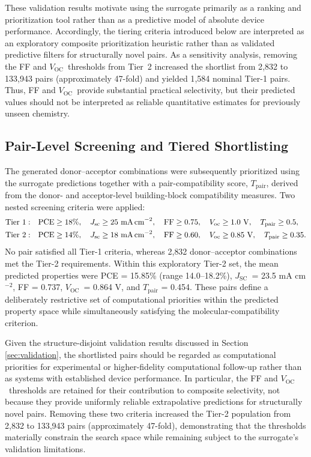 \documentclass[12pt]{article}
\newcommand{\voc}{$V_\mathrm{OC}$}
\newcommand{\jsc}{$J_\mathrm{SC}$}
\begin{document}
These validation results motivate using the surrogate primarily as a ranking and prioritization tool rather than as a predictive model of absolute device performance. Accordingly, the tiering criteria introduced below are interpreted as an exploratory composite prioritization heuristic rather than as validated predictive filters for structurally novel pairs. As a sensitivity analysis, removing the FF and \voc\ thresholds from Tier~2 increased the shortlist from 2{,}832 to 133{,}943 pairs (approximately 47-fold) and yielded 1{,}584 nominal Tier-1 pairs. Thus, FF and \voc\ provide substantial practical selectivity, but their predicted values should not be interpreted as reliable quantitative estimates for previously unseen chemistry.

\subsection{Pair-Level Screening and Tiered Shortlisting}
The generated donor--acceptor combinations were subsequently prioritized using the surrogate predictions together with a pair-compatibility score, $T_{\mathrm{pair}}$, derived from the donor- and acceptor-level building-block compatibility measures. Two nested screening criteria were applied:
\begin{equation}
\begin{aligned}
\mathrm{Tier\ 1}: \quad &
\mathrm{PCE} \geq 18\%, \quad
J_\mathrm{sc} \geq 25\ \text{mA\,cm}^{-2}, \quad
\mathrm{FF} \geq 0.75, \quad
V_\mathrm{oc} \geq 1.0\ \text{V}, \quad
T_{\mathrm{pair}} \geq 0.5,\\
\mathrm{Tier\ 2}: \quad &
\mathrm{PCE} \geq 14\%, \quad
J_\mathrm{sc} \geq 18\ \text{mA\,cm}^{-2}, \quad
\mathrm{FF} \geq 0.60, \quad
V_\mathrm{oc} \geq 0.85\ \text{V}, \quad
T_{\mathrm{pair}} \geq 0.35.
\end{aligned}
\end{equation}
No pair satisfied all Tier-1 criteria, whereas 2{,}832 donor--acceptor 
combinations met the Tier-2 requirements. Within this exploratory Tier-2 set, the mean predicted properties were PCE = 15.85\% (range 14.0--18.2\%), \jsc\ = 23.5 mA cm$^{-2}$, FF = 0.737, \voc\ = 0.864 V, and 
$T_{\mathrm{pair}}$ = 0.454. These pairs define a deliberately restrictive set of computational priorities within the predicted property space while 
simultaneously satisfying the molecular-compatibility criterion.

Given the structure-disjoint validation results discussed in Section \ref{sec:validation}, the shortlisted pairs should be regarded as computational priorities for experimental or higher-fidelity computational follow-up rather than as systems with established device performance. In particular, the FF and \voc\ thresholds are retained for their contribution to composite selectivity, not because they provide uniformly reliable extrapolative predictions for structurally novel pairs. Removing these two criteria increased the Tier-2 population from 2{,}832 to 133{,}943 pairs (approximately 47-fold), demonstrating that the thresholds materially constrain the search space while remaining subject to the surrogate's validation limitations.
\end{document}

